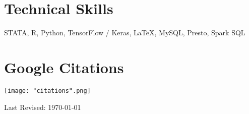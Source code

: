 \documentclass[10.5pt,letterpaper,sans]{moderncv}        %
\begin{document}
\section{Technical Skills}

STATA, R, Python, TensorFlow / Keras, \LaTeX, MySQL, Presto, Spark SQL\newline

\section{Google Citations}

\begin{minipage}{.5\linewidth}
   \texttt{[image: "citations".png]}
\end{minipage}

\bigskip

Last Revised: \today
\end{document}
